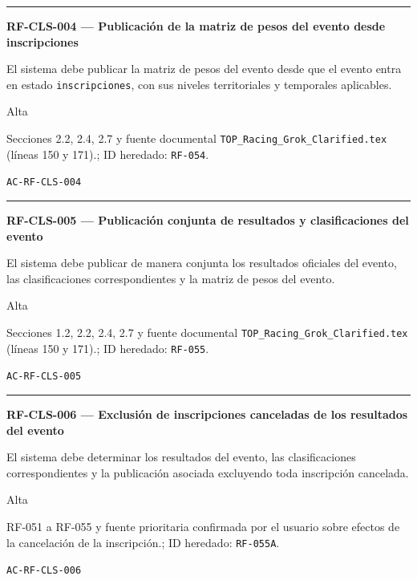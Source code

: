 \documentclass[10pt,letterpaper]{article}
\begin{document}
\vspace{0.25em}\hrule\vspace{0.65em}
\noindent\textbf{RF-CLS-004 --- Publicación de la matriz de pesos del evento desde inscripciones}\par
\begin{description}[style=nextline,leftmargin=3.15cm,labelwidth=2.8cm,font=\normalfont\bfseries]
\item[Obligación] El sistema debe publicar la matriz de pesos del evento desde que el evento entra en estado \texttt{inscripciones}, con sus niveles territoriales y temporales aplicables.
\item[Prioridad] Alta
\item[Procedencia] Secciones 2.2, 2.4, 2.7 y fuente documental \texttt{TOP\_Racing\_Grok\_Clarified.tex} (líneas 150 y 171).; ID heredado: \texttt{RF-054}.
\item[Verificación] \texttt{AC-RF-CLS-004}
\end{description}
\vspace{0.25em}\hrule\vspace{0.65em}
\noindent\textbf{RF-CLS-005 --- Publicación conjunta de resultados y clasificaciones del evento}\par
\begin{description}[style=nextline,leftmargin=3.15cm,labelwidth=2.8cm,font=\normalfont\bfseries]
\item[Obligación] El sistema debe publicar de manera conjunta los resultados oficiales del evento, las clasificaciones correspondientes y la matriz de pesos del evento.
\item[Prioridad] Alta
\item[Procedencia] Secciones 1.2, 2.2, 2.4, 2.7 y fuente documental \texttt{TOP\_Racing\_Grok\_Clarified.tex} (líneas 150 y 171).; ID heredado: \texttt{RF-055}.
\item[Verificación] \texttt{AC-RF-CLS-005}
\end{description}
\vspace{0.25em}\hrule\vspace{0.65em}
\noindent\textbf{RF-CLS-006 --- Exclusión de inscripciones canceladas de los resultados del evento}\par
\begin{description}[style=nextline,leftmargin=3.15cm,labelwidth=2.8cm,font=\normalfont\bfseries]
\item[Obligación] El sistema debe determinar los resultados del evento, las clasificaciones correspondientes y la publicación asociada excluyendo toda inscripción cancelada.
\item[Prioridad] Alta
\item[Procedencia] RF-051 a RF-055 y fuente prioritaria confirmada por el usuario sobre efectos de la cancelación de la inscripción.; ID heredado: \texttt{RF-055A}.
\item[Verificación] \texttt{AC-RF-CLS-006}
\end{description}
\end{document}
